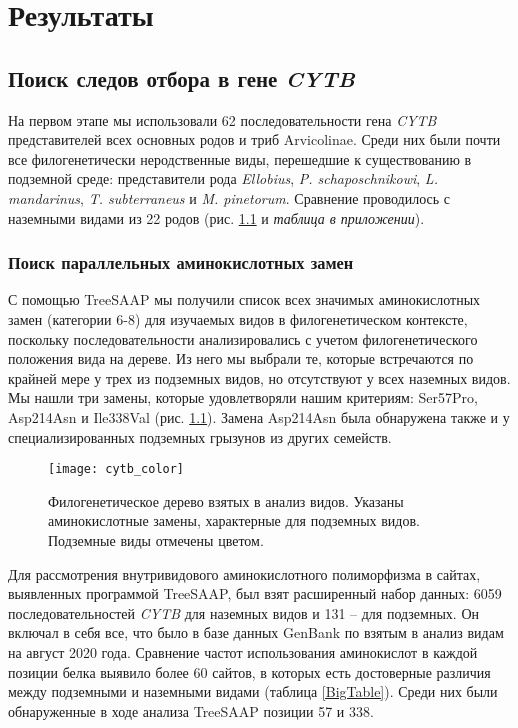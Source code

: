 \chapter{Результаты}\label{res}

\section{Поиск следов отбора в гене \textit{CYTB} }

На первом этапе мы использовали 62 последовательности гена \textit{CYTB} представителей всех основных родов и триб Arvicolinae. Среди них были почти все филогенетически неродственные виды, перешедшие к существованию в подземной среде: представители рода \textit{Ellobius}, \textit{P. schaposchnikowi}, \textit{L. mandarinus}, \textit{T. subterraneus} и \textit{M. pinetorum}. Сравнение проводилось с наземными видами из 22 родов (рис. \ref{PhyloTree} и \textit{таблица в приложении}). 

\subsection{Поиск параллельных аминокислотных замен}

С помощью TreeSAAP мы получили список всех значимых аминокислотных замен (категории 6-8) для изучаемых видов в филогенетическом контексте, поскольку последовательности анализировались с учетом филогенетического положения вида на дереве. Из него мы выбрали те, которые встречаются по крайней мере у трех из подземных видов, но отсутствуют у всех наземных видов. Мы нашли три замены, которые удовлетворяли нашим критериям: Ser57Pro, Asp214Asn и Ile338Val (рис. \ref{PhyloTree}). Замена Asp214Asn была обнаружена также и у специализированных подземных грызунов из других семейств.

\begin{figure}[h!]
	\begin{center}
		\texttt{[image: cytb\_color]}
	\end{center}
	\caption{Филогенетическое дерево взятых в анализ видов. Указаны аминокислотные замены, характерные для подземных видов. Подземные виды отмечены цветом.}
	\label{PhyloTree}
\end{figure}

\clearpage

Для рассмотрения внутривидового аминокислотного полиморфизма в сайтах, выявленных программой TreeSAAP, был взят расширенный набор данных: 6059 последовательностей \textit{CYTB} для наземных видов и 131 -- для подземных. Он включал в себя все, что было в базе данных GenBank по взятым в анализ видам на август 2020 года. Сравнение частот использования аминокислот в каждой позиции белка выявило более 60 сайтов, в которых есть достоверные различия между подземными и наземными видами (таблица \ref{BigTable}). Среди них были обнаруженные в ходе анализа TreeSAAP позиции 57 и 338.

